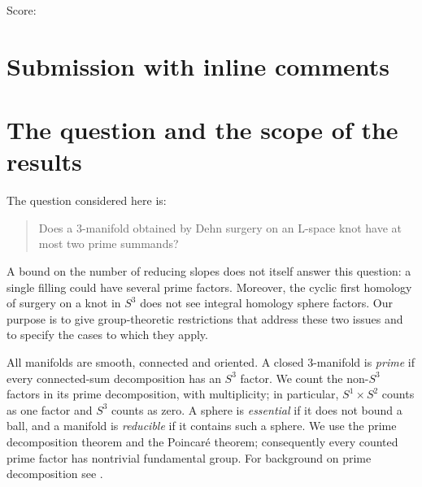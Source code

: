 \documentclass[11pt]{article}
\theoremstyle{remark}
\begin{document}
\noindent Score:

\newpage
\section{Submission with inline comments}


\begin{abstract}
We study the question whether surgery on an L-space knot has at most two prime summands. For a fibered knot of genus $g\geq1$ in $S^3$, we prove that a nonzero rational surgery whose numerator has absolute value $2g-1$ has at most two nontrivial prime summands. The proof uses the free commutator subgroup of the knot group and explicit covers of free products; it retains integral homology sphere factors that first homology alone cannot detect. A related argument shows that a nonzero integer surgery with at least three summands on a fibered hyperbolic knot must satisfy $|p|\leq2g-1$. Together with the reducing-slope theorem of Hom--Lidman--Zufelt, the first result gives the two-summand bound for hyperbolic knots in $S^3$ admitting a mod-two L-space surgery. We also give a formal obstruction to a difference-only argument and explain the role of the ambient manifold through a Seifert-fibered example. These are partial results on the original question, not an all-knot, all-coefficient conclusion.
\end{abstract}

\section{The question and the scope of the results}

The question considered here is:
\begin{quote}
Does a $3$-manifold obtained by Dehn surgery on an L-space knot have at most two prime summands?
\end{quote}
A bound on the number of reducing slopes does not itself answer this question: a single filling could have several prime factors. Moreover, the cyclic first homology of surgery on a knot in $S^3$ does not see integral homology sphere factors. Our purpose is to give group-theoretic restrictions that address these two issues and to specify the cases to which they apply.

All manifolds are smooth, connected and oriented. A closed $3$-manifold is \emph{prime} if every connected-sum decomposition has an $S^3$ factor. We count the non-$S^3$ factors in its prime decomposition, with multiplicity; in particular, $S^1\times S^2$ counts as one factor and $S^3$ counts as zero. A sphere is \emph{essential} if it does not bound a ball, and a manifold is \emph{reducible} if it contains such a sphere. We use the prime decomposition theorem and the Poincar\'e theorem; consequently every counted prime factor has nontrivial fundamental group. For background on prime decomposition see \cite[Section~1.1]{Hatcher}.
\end{document}

